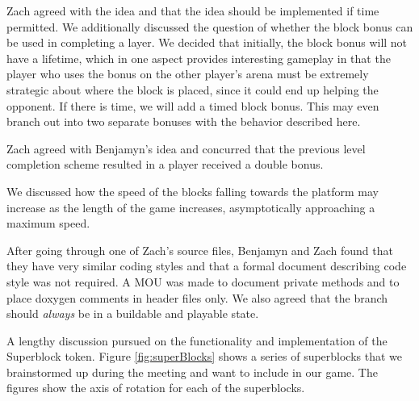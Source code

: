 
Zach agreed with the idea and that the idea should be implemented if time
permitted. We additionally discussed the question of whether the block bonus
can be used in completing a layer. We decided that initially, the block bonus
will not have a lifetime, which in one aspect provides interesting gameplay in
that the player who uses the bonus on the other player's arena must be
extremely strategic about where the block is placed, since it could end up
helping the opponent. If there is time, we will add a timed block bonus. This
may even branch out into two separate bonuses with the behavior described here.



Zach agreed with Benjamyn's idea and concurred that the previous level
completion scheme resulted in a player received a double bonus.

We discussed how the speed of the blocks falling towards the platform may
increase as the length of the game increases, asymptotically approaching a
maximum speed.

After going through one of Zach's source files, Benjamyn and Zach found that
they have very similar coding styles and that a formal document describing code
style was not required. A MOU was made to document private methods and to place
doxygen comments in header files only. We also agreed that the 
branch should \emph{always} be in a buildable and playable state.


A lengthy discussion pursued on the functionality and implementation of the
Superblock token. Figure \ref{fig:superBlocks} shows a series of superblocks
that we brainstormed up during the meeting and want to include in our game. The
figures show the axis of rotation for each of the superblocks.

